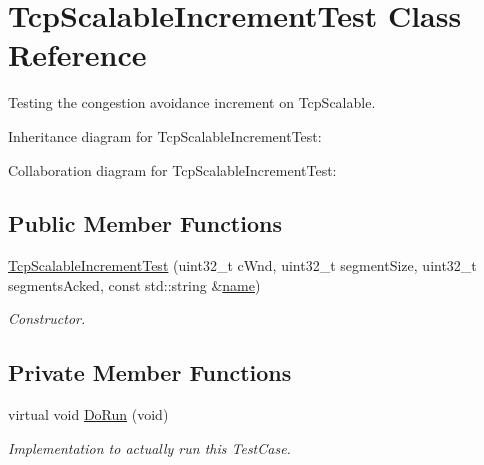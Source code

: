 \hypertarget{classTcpScalableIncrementTest}{}\section{Tcp\+Scalable\+Increment\+Test Class Reference}
\label{classTcpScalableIncrementTest}


Testing the congestion avoidance increment on Tcp\+Scalable.  




Inheritance diagram for Tcp\+Scalable\+Increment\+Test\+:


Collaboration diagram for Tcp\+Scalable\+Increment\+Test\+:
\subsection*{Public Member Functions}
\begin{DoxyCompactItemize}
\item 
\hyperlink{classTcpScalableIncrementTest_a5e3b96c195e9c5757fecdc82ec722122}{Tcp\+Scalable\+Increment\+Test} (uint32\+\_\+t c\+Wnd, uint32\+\_\+t segment\+Size, uint32\+\_\+t segments\+Acked, const std\+::string \&\hyperlink{generate__test__data__lte__spectrum__model_8m_ab74e6bf80237ddc4109968cedc58c151}{name})
\begin{DoxyCompactList}\small\item\em Constructor. \end{DoxyCompactList}\end{DoxyCompactItemize}
\subsection*{Private Member Functions}
\begin{DoxyCompactItemize}
\item 
virtual void \hyperlink{classTcpScalableIncrementTest_adcf9cbca755cffbba599bc635bbfe1d8}{Do\+Run} (void)
\begin{DoxyCompactList}\small\item\em Implementation to actually run this Test\+Case. \end{DoxyCompactList}\end{DoxyCompactItemize}
